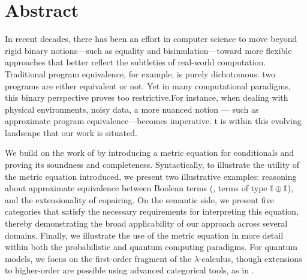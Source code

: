 \chapter*{Abstract}

\begin{comment}
Noisy intermediate-scale quantum (NISQ)  computers are expected to operate with severely limited hardware resources. Precisely controlling qubits in these systems comes at a high cost, is susceptible to errors, and faces scarcity challenges. Therefore, error analysis is indispensable for the design, optimization, and assessment of NISQ computing. Nevertheless, the analysis of errors in quantum programs poses a significant challenge. The overarching goal of the M.Sc. project is to provide a fully-fledged
quantum programming language on which to study metric program equivalence
in various scenarios, such as in quantum algorithmics and quantum information theory.
\end{comment}

In recent decades, there has been an effort in computer science to move beyond rigid binary notions—such as equality and bisimulation—toward more flexible approaches that better reflect the  subtleties of real-world computation. Traditional program equivalence, for example, is purely dichotomous: two programs are either equivalent or not. Yet in many computational paradigms, this binary perspective proves too restrictive.For instance, when dealing with physical environments, noisy data, a more nuanced notion --- such as approximate program equivalence---becomes imperative. t is within this evolving landscape that our work is situated.

We build on the work of \cite{dahlqvist2023syntactic} by introducing a metric equation for conditionals and proving its soundness and completeness. 
Syntactically, to illustrate the utility of the metric equation introduced, we present two illustrative examples: reasoning about approximate equivalence between Boolean terms (\ie, terms of type $ \mathbb{I} \oplus \mathbb{I} $), and the extensionality of copairing. On the semantic side, we present five categories that satisfy the necessary requirements for interpreting this equation, thereby demonstrating the broad applicability of our approach across several domains. Finally, we illustrate the use of the metric equation in more detail within both the probabilistic and quantum computing paradigms. For quantum models, we focus on the first-order fragment of the $\lambda$-calculus, though extensions to higher-order are possible using advanced categorical tools, as in \cite{dahlqvist2023syntactic}. 

